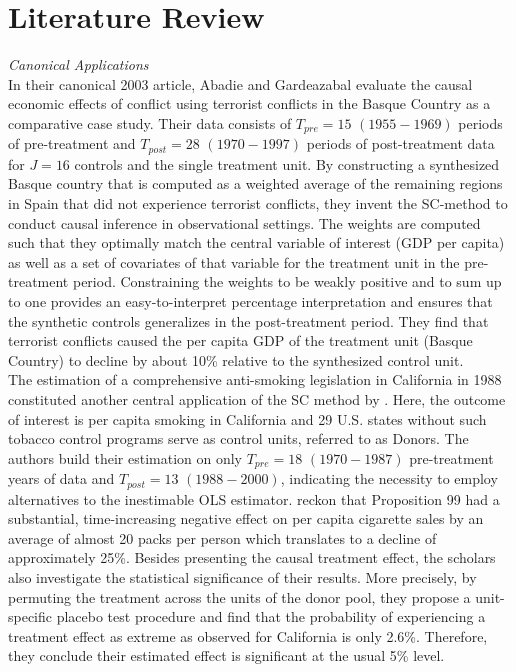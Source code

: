\section{Literature Review}
\label{Chap2}
\textit{Canonical Applications}\\
In their canonical 2003 article, Abadie and Gardeazabal evaluate the causal economic effects of conflict using terrorist conflicts in the Basque Country as a comparative case study. Their data consists of $T_{pre} = 15$ $(1955-1969)$ periods of pre-treatment and $T_{post} = 28$  $(1970-1997)$ periods of post-treatment data for $J = 16$ controls and the single treatment unit. By constructing a synthesized Basque country that is computed as a weighted average of  the remaining regions in Spain that did not experience terrorist conflicts, they invent the \ac{SC}-method to conduct causal inference in observational settings. The weights are computed such that they optimally match the central variable of interest (\ac{GDP} per capita) as well as a set of covariates of that variable for the treatment unit in the pre-treatment period. Constraining the weights to be weakly positive and to sum up to one provides an easy-to-interpret percentage interpretation and ensures that the synthetic controls generalizes in the post-treatment period. They find that terrorist conflicts caused the per capita \ac{GDP} of the treatment unit (Basque Country) to decline by about 10\% relative to the synthesized control unit. \\
The estimation of a comprehensive anti-smoking legislation in California in 1988 constituted another central application of the \ac{SC} method by \cite{abadie:2010}. Here, the outcome of interest is per capita smoking in California and 29 U.S. states without such tobacco control programs serve as control units, referred to as Donors. The authors build their estimation on only $T_{pre} = 18$ $(1970-1987)$ pre-treatment years of data and $T_{post} = 13$ $(1988-2000)$, indicating the necessity to employ alternatives to the inestimable \ac{OLS} estimator. \cite{abadie:2010} reckon that Proposition 99 had a substantial, time-increasing negative effect on per capita cigarette sales by an average of almost 20 packs per person which translates to a decline of approximately 25\%. Besides presenting the causal treatment effect, the scholars also investigate the statistical significance of their results. More precisely, by permuting the treatment across the units of the donor pool, they propose a unit-specific placebo test procedure and find that the probability of experiencing a treatment effect as extreme as observed for California is only 2.6\%. Therefore, they conclude their estimated effect is significant at the usual 5\% level.\\
